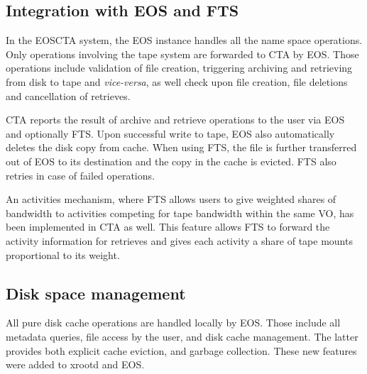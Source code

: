 \documentclass{webofc}
\begin{document}
\subsection{Integration with EOS and FTS}
\label{sec:integration}


In the EOSCTA system, the EOS instance handles all the name space operations. Only operations involving the
tape system are forwarded to CTA by EOS. Those operations include validation of file creation,
triggering archiving and retrieving from disk to tape and {\em{}vice-versa}, as well check upon
file creation, file deletions and cancellation of retrieves.

CTA reports the result of archive and retrieve operations to the user via EOS and optionally FTS.
Upon successful write to tape, EOS also automatically deletes the disk copy from cache.
When using FTS, the file is further transferred out of EOS to its destination and the copy in the 
cache is evicted. FTS also retries in case of failed operations.

An activities mechanism, where FTS allows users to give weighted shares of bandwidth to activities competing
for tape bandwidth within the same VO, has been implemented in CTA as well. This feature allows FTS to forward
the activity information for retrieves and gives each activity a share of tape mounts proportional to its weight.

\subsection{Disk space management}

All pure disk cache operations are handled locally by EOS. Those include
all metadata queries, file access by the user, and disk cache management. The latter provides 
both explicit cache eviction, and garbage collection. These new features were added to xrootd and EOS.
\end{document}
